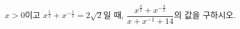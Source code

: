 $x>0$이고 $x^{\frac{1}{2}}+x^{-\frac{1}{2}}=2\sqrt{2}$일 때, $\dfrac{x^{\frac{3}{2}}+x^{-\frac{3}{2}}}{x+x^{-1}+14}$의 값을 구하시오.
